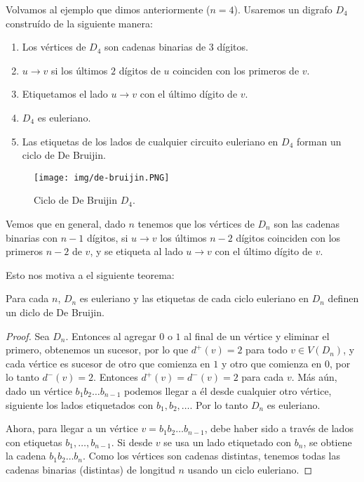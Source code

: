 Volvamos al ejemplo que dimos anteriormente ($n=4$). Usaremos un digrafo $D_4$ construído de la siguiente manera:

\begin{enumerate}
    \item Los vértices de $D_4$ son cadenas binarias de $3$ dígitos.
    \item $u \rightarrow v$ si los últimos $2$ dígitos de $u$ coinciden con los primeros de $v$.
    \item Etiquetamos el lado $u \rightarrow v$ con el último dígito de $v$.
    \item $D_4$ es euleriano.
    \item Las etiquetas de los lados de cualquier circuito euleriano en $D_4$ forman un ciclo de De Bruijin.
\end{enumerate}

\begin{figure}
    \centering
    \texttt{[image: img/de-bruijin.PNG]}
    \caption{Ciclo de De Bruijin $D_4$.}
    \label{fig:de-bruijin}
\end{figure}

Vemos que en general, dado $n$ tenemos que los vértices de $D_n$ son las cadenas binarias con $n-1$ dígitos, si $u \rightarrow v$ los últimos $n-2$ dígitos coinciden con los primeros $n-2$ de $v$, y se etiqueta al lado $u \rightarrow v$ con el último dígito de $v$.

Esto nos motiva a el siguiente teorema:

\begin{teo}
    Para cada $n$, $D_n$ es euleriano y las etiquetas de cada ciclo euleriano en $D_n$ definen un diclo de De Bruijin.
\end{teo}

\begin{proof}
    Sea $D_n$. Entonces al agregar $0$ o $1$ al final de un vértice y eliminar el primero, obtenemos un sucesor, por lo que $d^+(v) = 2$ para todo $v \in V(D_n)$, y cada vértice es sucesor de otro que comienza en $1$ y otro que comienza en $0$, por lo tanto $d^-(v) = 2$. Entonces $d^+(v) = d^-(v) = 2$ para cada $v$. Más aún, dado un vértice $b_1b_2 \dots b_{n-1}$ podemos llegar a él desde cualquier otro vértice, siguiente los lados etiquetados con $b_1, b_2, \dots$. Por lo tanto $D_n$ es euleriano.
    
    Ahora, para llegar a un vértice $v = b_1b_2 \dots b_{n-1}$, debe haber sido a través de lados con etiquetas $b_1, \dots, b_{n-1}$. Si desde $v$ se usa un lado etiquetado con $b_n$, se obtiene la cadena $b_1b_2 \dots b_n$. Como los vértices son cadenas distintas, tenemos todas las cadenas binarias (distintas) de longitud $n$ usando un ciclo euleriano.
\end{proof}

